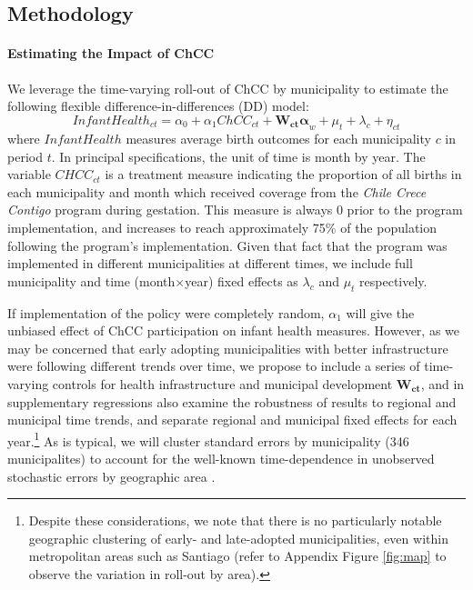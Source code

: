 \documentclass[12pt]{article}
\begin{document}
\begin{spacing}{1.4}
\section{Methodology}
\paragraph{Estimating the Impact of ChCC}
We leverage the time-varying roll-out of ChCC by municipality to estimate
the following flexible difference-in-differences (DD) model:
\begin{equation}
  \label{eqn:DD}
  Infant Health_{ct} = \alpha_0 + \alpha_1 ChCC_{ct} + \bm{W_{ct}\alpha}_{w} + \mu_t + \lambda_c + \eta_{ct}
\end{equation}
where $InfantHealth$ measures average birth outcomes for each
municipality $c$ in period $t$.  In principal specifications,
the unit of time is month by year. The variable $CHCC_{ct}$ is
a treatment measure indicating the proportion of all births in
each municipality and month which received coverage from the
\emph{Chile Crece Contigo} program during gestation.  This measure is
always 0 prior to the program implementation, and increases
to reach approximately 75\% of the population following the
program's implementation.  Given that fact that the program
was implemented in different municipalities at different times,
we include full municipality and time (month$\times$year) fixed
effects as $\lambda_c$ and $\mu_t$ respectively.

If implementation of the policy were completely random,
$\alpha_1$ will give the unbiased effect of ChCC participation on
infant health measures.  However, as we may be concerned that
early adopting municipalities with better infrastructure were
following different trends over time, we propose to include
a series of time-varying controls for health infrastructure
and municipal development $\bm{W_{ct}}$, and in supplementary
regressions also examine the robustness of results to regional
and municipal time trends, and separate regional and municipal
fixed effects for each year.\footnote{Despite these considerations,
  we note that there is no particularly notable geographic
  clustering of early- and late-adopted municipalities,
  even within metropolitan areas such as Santiago (refer to
  Appendix Figure \ref{fig:map} to observe the variation in
  roll-out by area).}
As is typical, we will cluster standard errors by municipality
(346 municipalites) to account for the well-known time-dependence
in unobserved stochastic errors by geographic area
\citep{Bertrandetal2004,CameronMiller2015}.


\end{spacing}
\end{document}
